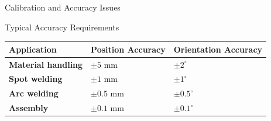 \documentclass[10pt,aspectratio=169]{beamer}
\begin{document}
\begin{frame}{Calibration and Accuracy Issues}
\vspace{0.5cm}
\begin{block}{Typical Accuracy Requirements}
\begin{table}
\centering
\scriptsize
\begin{tabular}{p{}p{}p{}}
\toprule
\textbf{Application} & \textbf{Position Accuracy} & \textbf{Orientation Accuracy} \\
\midrule
\textbf{Material handling} & $\pm 5$ mm & $\pm 2^\circ$ \\
\textbf{Spot welding} & $\pm 1$ mm & $\pm 1^\circ$ \\
\textbf{Arc welding} & $\pm 0.5$ mm & $\pm 0.5^\circ$ \\
\textbf{Assembly} & $\pm 0.1$ mm & $\pm 0.1^\circ$ \\
\bottomrule
\end{tabular}
\end{table}
\end{block}
\end{frame}
\end{document}
